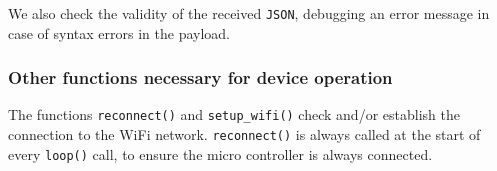 \documentclass{article}
\begin{document}
We also check the validity of the received \texttt{JSON}, debugging an error
message in case of syntax errors in the payload.

\subsubsection{Other functions necessary for device operation}

The functions \verb|reconnect()| and \verb|setup_wifi()| check and/or establish
the connection to the WiFi network. \texttt{reconnect()} is always called at the
start of every \texttt{loop()} call, to ensure the micro controller is always
connected.



\end{document}
